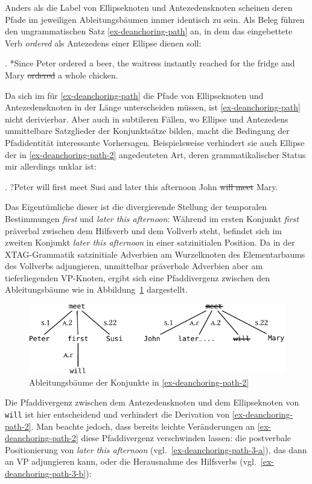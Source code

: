 Anders als die Label von Ellipseknoten und Antezedensknoten scheinen deren Pfade im jeweiligen Ableitungsbäumen immer identisch zu sein. Als Beleg führen \cite{Lichte:Kallmeyer:10} den ungrammatischen Satz \ref{ex-deanchoring-path} an, in dem das eingebettete Verb {\it ordered} als Antezedens einer Ellipse dienen soll:  

\ex. *Since Peter ordered a beer, the waitress instantly reached for the fridge and Mary \sout{ordered} a whole chicken. \hfill \citep[(10)]{Lichte:Kallmeyer:10}\label{ex-deanchoring-path}

Da sich im  für \ref{ex-deanchoring-path} die Pfade von Ellipseknoten und Antezedensknoten in der Länge  unterscheiden müssen, ist \ref{ex-deanchoring-path} nicht derivierbar. Aber auch in subtileren Fällen, wo Ellipse und Antezedens unmittelbare Satzglieder der Konjunktsätze bilden, macht die Bedingung der Pfadidentität interessante Vorhersagen. Beispielsweise verhindert sie auch Ellipse der in \ref{ex-deanchoring-path-2} angedeuteten Art, deren grammatikalischer Status mir allerdings unklar ist:

\ex. \label{ex-deanchoring-path-2} 
?Peter will first meet Susi and later this afternoon John \sout{will meet} Mary.

Das Eigentümliche dieser  ist die divergierende Stellung der temporalen Bestimmungen {\it first} und {\it later this afternoon}: Während im ersten Konjunkt {\it first} präverbal zwischen dem Hilfsverb und dem Vollverb steht, befindet sich im zweiten Konjunkt {\it later this afternoon} in einer satzinitialen Position. Da in der XTAG-Grammatik satzinitiale Adverbien am Wurzelknoten des Elementarbaums des Vollverbs adjungieren, unmittelbar präverbale Adverbien aber am tieferliegenden VP-Knoten, ergibt sich eine Pfaddivergenz zwischen den Ableitungsbäume wie in Abbildung~\ref{fig-deanchoring-path} dargestellt. 
\begin{figure}[t]
\centering
\includegraphics{graphics/abb823.pdf}
\caption{\label{fig-deanchoring-path}Ableitungsbäume der Konjunkte in \ref{ex-deanchoring-path-2}}
\end{figure}
Die Pfaddivergenz zwischen dem Antezedensknoten und dem Ellipseknoten von {\tt will} ist hier entscheidend und verhindert  die Derivation von \ref{ex-deanchoring-path-2}. Man beachte jedoch, dass bereits leichte Veränderungen an \ref{ex-deanchoring-path-2} diese Pfaddivergenz verschwinden lassen: die postverbale Positionierung von {\it later this afternoon} (vgl.\ \ref{ex-deanchoring-path-3-a}), das dann an VP adjungieren kann, oder die Herausnahme des Hilfsverbs (vgl.\ \ref{ex-deanchoring-path-3-b}): 

